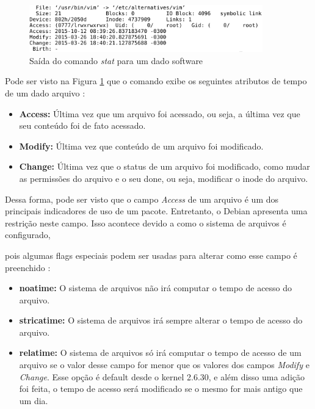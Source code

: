 \begin{figure}[h]
  \centering
  \includegraphics[width=0.9\textwidth]{figuras/comando_stat.eps}
  \caption{Saída do comando \textit{stat} para um dado software}
  \label{fig:comando_stat}
\end{figure}

Pode ser visto na Figura \ref{fig:comando_stat} que o comando exibe os seguintes
atributos de tempo de um dado arquivo \cite{1_haas}:

\begin{itemize}
    \item \textbf{Access:} Última vez que um arquivo foi acessado, ou seja, a
        última vez que seu conteúdo foi de fato acessado.
    \item \textbf{Modify:} Última vez que conteúdo de um arquivo foi modificado.
    \item \textbf{Change:} Última vez que o status de um arquivo foi modificado,
        como mudar as permissões do arquivo e o seu done, ou seja, modificar o
        inode do arquivo.
\end{itemize}

Dessa forma, pode ser visto que o campo \textit{Access} de um arquivo é um dos
principais indicadores de uso de um pacote. Entretanto, o Debian apresenta uma
restrição neste campo. Isso acontece devido a como o sistema de arquivos é
configurado,

pois algumas flags especiais podem ser usadas para alterar como
esse campo é preenchido \cite{2_wiki.debian.org}:

\begin{itemize}
    \item \textbf{noatime:} O sistema de arquivos não irá computar o tempo de
        acesso do arquivo.
    \item \textbf{stricatime:} O sistema de arquivos irá sempre alterar o tempo
        de acesso do arquivo.
    \item \textbf{relatime:} O sistema de arquivos só irá computar o tempo de
        acesso de um arquivo se o valor desse campo for menor que os valores dos
        campos \textit{Modify} e \textit{Change}. Esse opção é default desde
        o kernel 2.6.30, e além disso uma adição foi feita, o tempo de acesso será
        modificado se o mesmo for mais antigo que um dia.
\end{itemize}

